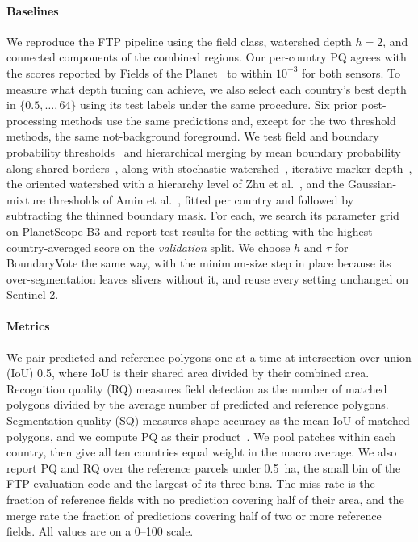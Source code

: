 \documentclass[journal]{IEEEtran}
\begin{document}
\paragraph{Baselines}
We reproduce the FTP pipeline using the field class, watershed depth $h=2$, and connected components of the combined regions.
Our per-country PQ agrees with the scores reported by Fields of the Planet~\cite{corley_ftp} to within $10^{-3}$ for both sensors.
To measure what depth tuning can achieve, we also select each country's best depth in $\{0.5,\ldots,64\}$ using its test labels under the same procedure.
Six prior post-processing methods use the same predictions and, except for the two threshold methods, the same not-background foreground.
We test field and boundary probability thresholds~\cite{waldner2020decode} and hierarchical merging by mean boundary probability along shared borders~\cite{arbelaez2011hierarchical,persello2019delineation}, along with stochastic watershed~\cite{angulo2007stochastic}, iterative marker depth~\cite{koyuncu2016iterative}, the oriented watershed with a hierarchy level of Zhu et al.~\cite{zhu2024gfafd}, and the Gaussian-mixture thresholds of Amin et al.~\cite{amin2025earlyseason}, fitted per country and followed by subtracting the thinned boundary mask.
For each, we search its parameter grid on PlanetScope B3 and report test results for the setting with the highest country-averaged score on the \emph{validation} split.
We choose $h$ and $\tau$ for BoundaryVote the same way, with the minimum-size step in place because its over-segmentation leaves slivers without it, and reuse every setting unchanged on Sentinel-2.

\paragraph{Metrics}
We pair predicted and reference polygons one at a time at intersection over union (IoU) 0.5, where IoU is their shared area divided by their combined area.
Recognition quality (RQ) measures field detection as the number of matched polygons divided by the average number of predicted and reference polygons.
Segmentation quality (SQ) measures shape accuracy as the mean IoU of matched polygons, and we compute PQ as their product~\cite{kirillov2019panoptic}.
We pool patches within each country, then give all ten countries equal weight in the macro average.
We also report PQ and RQ over the reference parcels under 0.5~ha, the small bin of the FTP evaluation code and the largest of its three bins.
The miss rate is the fraction of reference fields with no prediction covering half of their area, and the merge rate the fraction of predictions covering half of two or more reference fields.
All values are on a 0--100 scale.
\end{document}
